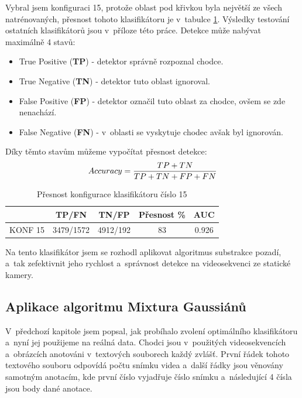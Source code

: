 Vybral jsem konfiguraci 15, protože oblast pod křivkou byla největší ze všech natrénovaných, přesnost tohoto klasifikátoru je v~tabulce \ref{classTab2}. Výsledky testování ostatních klasifikátorů jsou v~příloze této práce. Detekce může nabývat maximálně 4 stavů:
\begin{itemize}
	\item{True Positive (\textbf{TP}) - detektor správně rozpoznal chodce.}
	\item{True Negative (\textbf{TN}) - detektor tuto oblast ignoroval.}
	\item{False Positive (\textbf{FP}) - detektor označil tuto oblast za chodce, ovšem se zde nenachází.}
	\item{False Negative (\textbf{FN}) - v~oblasti se vyskytuje chodec avšak byl ignorován.}
\end{itemize}
Díky těmto stavům můžeme vypočítat přesnost detekce:
\begin{equation*}
\centering
 \label{eq:accuracy}
 \begin{aligned}
Accuracy = \frac{TP + TN}{TP + TN + FP + FN}
 \end{aligned}
\end{equation*}

\begin{table}[H]
\centering
\caption{Přesnost konfigurace klasifikátoru číslo 15}
\begin{tabular} { |c|c|c|c|c| }
\hline
{}          & {TP/FN} 	 & {TN/FP} 	& {Přesnost \%} & {AUC}  \\ \hline
KONF 15 	&  3479/1572 & 4912/192 &     83 		& 0.926  \\ \hline
\end{tabular}
\label{classTab2}
\end{table}
Na tento klasifikátor jsem se rozhodl aplikovat algoritmus substrakce pozadí, a~tak zefektivnit jeho rychlost a~správnost detekce na videosekvenci ze statické kamery.

\subsection{Aplikace algoritmu Mixtura Gaussiánů}
V~předchozí kapitole jsem popsal, jak probíhalo zvolení optimálního klasifikátoru a~nyní jej použijeme na reálná data. Chodci jsou v~použitých videosekvencích a~obrázcích anotováni v~textových souborech každý zvlášť. První řádek tohoto textového souboru odpovídá počtu snímku videa a~další řádky jsou věnovány samotným anotacím, kde první číslo vyjadřuje číslo snímku a~následující 4 čísla jsou body dané anotace.

